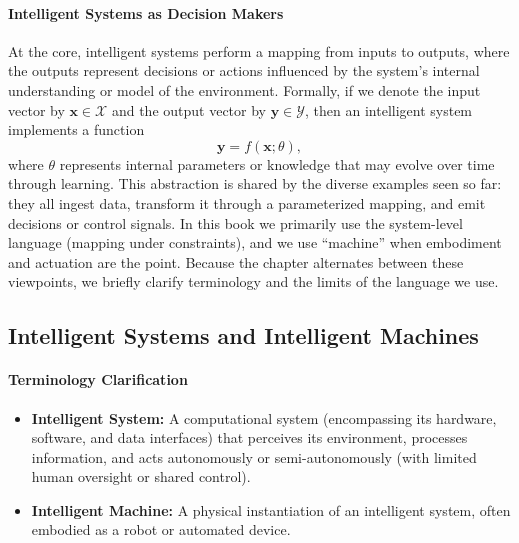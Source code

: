 \paragraph{Intelligent Systems as Decision Makers}

At the core, intelligent systems perform a mapping from inputs to outputs, where the outputs represent decisions or actions influenced by the system's internal understanding or model of the environment. Formally, if we denote the input vector by $\mathbf{x} \in \mathcal{X}$ and the output vector by $\mathbf{y} \in \mathcal{Y}$, then an intelligent system implements a function
\begin{equation}
    \mathbf{y} = f(\mathbf{x}; \theta),
    \label{eq:intelligent_mapping}
\end{equation}
where $\theta$ represents internal parameters or knowledge that may evolve over time through learning. This abstraction is shared by the diverse examples seen so far: they all ingest data, transform it through a parameterized mapping, and emit decisions or control signals. In this book we primarily use the system-level language (mapping under constraints), and we use ``machine'' when embodiment and actuation are the point. Because the chapter alternates between these viewpoints, we briefly clarify terminology and the limits of the language we use.

\subsection{Intelligent Systems and Intelligent Machines}
\label{sec:intro_intelligent_systems_and_intelligent_machines}

\paragraph{Terminology Clarification}

\begin{itemize}
\item \textbf{Intelligent System:} A computational system (encompassing its hardware, software, and data interfaces) that perceives its environment, processes information, and acts autonomously or semi-autonomously (with limited human oversight or shared control).

    \item \textbf{Intelligent Machine:} A physical instantiation of an intelligent system, often embodied as a robot or automated device.
\end{itemize}

